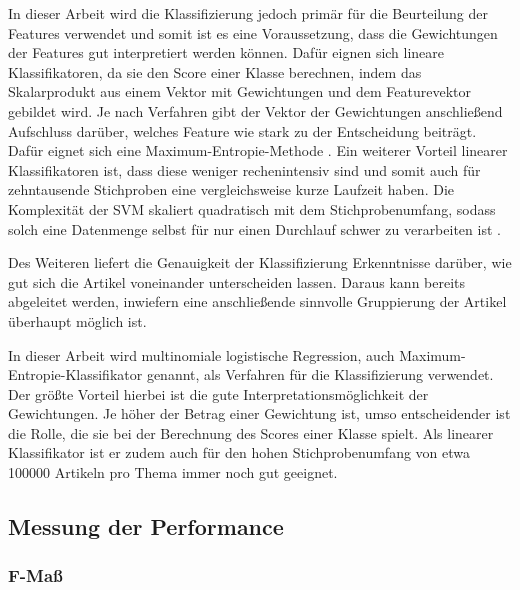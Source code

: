 In dieser Arbeit wird die Klassifizierung jedoch primär für die Beurteilung der Features verwendet und somit ist es eine Voraussetzung, dass die Gewichtungen der Features gut interpretiert werden können. Dafür eignen sich lineare Klassifikatoren, da sie den Score einer Klasse berechnen, indem das Skalarprodukt aus einem Vektor mit Gewichtungen und dem Featurevektor gebildet wird. Je nach Verfahren gibt der Vektor der Gewichtungen anschließend Aufschluss darüber, welches Feature wie stark zu der Entscheidung beiträgt. Dafür eignet sich eine Maximum-Entropie-Methode \cite[K.~2]{cimino2017identifying}. Ein weiterer Vorteil linearer Klassifikatoren ist, dass diese weniger rechenintensiv sind und somit auch für zehntausende Stichproben eine vergleichsweise kurze Laufzeit haben. Die Komplexität der SVM skaliert quadratisch mit dem Stichprobenumfang, sodass solch eine Datenmenge selbst für nur einen Durchlauf schwer zu verarbeiten ist \cite[Seite: sklearn.svm.SVC]{scikitlearnAPIReference}.

Des Weiteren liefert die Genauigkeit der Klassifizierung Erkenntnisse darüber, wie gut sich die Artikel voneinander unterscheiden lassen. Daraus kann bereits abgeleitet werden, inwiefern eine anschließende sinnvolle Gruppierung der Artikel überhaupt möglich ist.

In dieser Arbeit wird multinomiale logistische Regression, auch Maximum-Entropie-Klassifikator genannt, als Verfahren für die Klassifizierung verwendet. Der größte Vorteil hierbei ist die gute Interpretationsmöglichkeit der Gewichtungen. Je höher der Betrag einer Gewichtung ist, umso entscheidender ist die Rolle, die sie bei der Berechnung des Scores einer Klasse spielt. Als linearer Klassifikator ist er zudem auch für den hohen Stichprobenumfang von etwa 100000 Artikeln pro Thema immer noch gut geeignet.

\subsection{Messung der Performance}
\subsubsection*{F-Maß}
